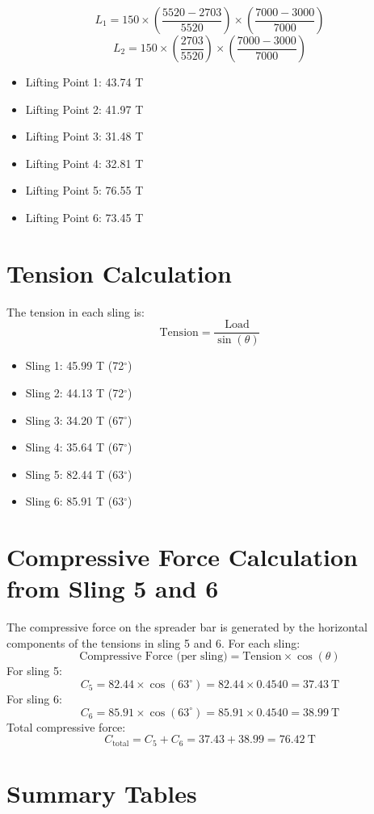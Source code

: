 \documentclass[12pt]{article}
\begin{document}
\[ L_1 = 150 \times \left( \frac{5520-2703}{5520} \right) \times \left( \frac{7000-3000}{7000} \right) \]
\[ L_2 = 150 \times \left( \frac{2703}{5520} \right) \times \left( \frac{7000-3000}{7000} \right)\]


\begin{itemize}
  \item Lifting Point 1: 43.74 T
  \item Lifting Point 2: 41.97 T
  \item Lifting Point 3: 31.48 T
  \item Lifting Point 4: 32.81 T
  \item Lifting Point 5: 76.55 T
  \item Lifting Point 6: 73.45 T
\end{itemize}

\section{Tension Calculation}
The tension in each sling is:
\[
\text{Tension} = \frac{\text{Load}}{\sin(\theta)}
\]
\begin{itemize}
  \item Sling 1: 45.99 T (72$^\circ$)
  \item Sling 2: 44.13 T (72$^\circ$)
  \item Sling 3: 34.20 T (67$^\circ$)
  \item Sling 4: 35.64 T (67$^\circ$)
  \item Sling 5: 82.44 T (63$^\circ$)
  \item Sling 6: 85.91 T (63$^\circ$)
\end{itemize}

\section{Compressive Force Calculation from Sling 5 and 6}
The compressive force on the spreader bar is generated by the horizontal components of the tensions in sling 5 and 6. For each sling:
\[
\text{Compressive Force (per sling)} = \text{Tension} \times \cos(\theta)
\]
For sling 5:
\[
C_5 = 82.44 \times \cos(63^\circ) = 82.44 \times 0.4540 = 37.43~\text{T}
\]
For sling 6:
\[
C_6 = 85.91 \times \cos(63^\circ) = 85.91 \times 0.4540 = 38.99~\text{T}
\]
Total compressive force:
\[
C_{\text{total}} = C_5 + C_6 = 37.43 + 38.99 = 76.42~\text{T}
\]

\section{Summary Tables}
\end{document}

